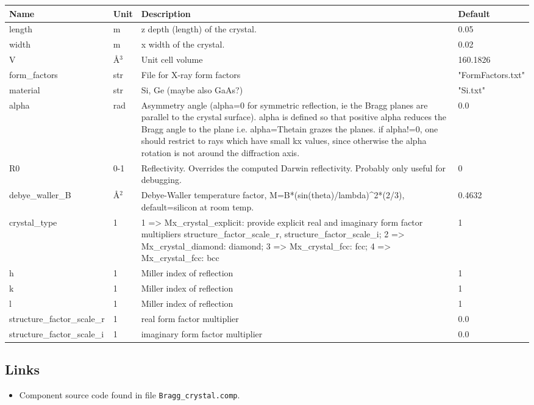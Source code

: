 \begin{longtable}{p{}p{}p{}p{}}
\toprule
\textbf{Name} & \textbf{Unit} & \textbf{Description} & \textbf{Default} \\
\midrule
\endhead
length & m & z depth (length) of the crystal. & 0.05 \\
width & m & x width of the crystal. & 0.02 \\
V & \AA{}$^{3}$ & Unit cell volume & 160.1826 \\
form\_factors & str & File for X-ray form factors & "FormFactors.txt" \\
material & str & Si, Ge (maybe also GaAs?) & "Si.txt" \\
alpha & rad & Asymmetry angle (alpha=0 for symmetric reflection, ie the Bragg planes are parallel to the crystal surface). alpha is defined so that positive alpha reduces the Bragg angle to the plane i.e. alpha=Thetain grazes the planes. if alpha!=0,  one should restrict to rays which have small kx values, since otherwise the alpha rotation is not around the diffraction axis. & 0.0 \\
R0 & 0-1 & Reflectivity. Overrides the computed Darwin reflectivity. Probably only useful for debugging. & 0 \\
debye\_waller\_B & \AA{}$^{2}$ & Debye-Waller temperature factor, M=B*(sin(theta)/lambda)\textasciicircum{}2*(2/3), default=silicon at room temp. & 0.4632 \\
crystal\_type & 1 & 1 =\textgreater{} Mx\_crystal\_explicit: provide explicit real and imaginary form factor multipliers structure\_factor\_scale\_r, structure\_factor\_scale\_i; 2 =\textgreater{} Mx\_crystal\_diamond: diamond; 3 =\textgreater{} Mx\_crystal\_fcc: fcc; 4 =\textgreater{} Mx\_crystal\_fcc: bcc & 1 \\
h & 1 & Miller index of reflection & 1 \\
k & 1 & Miller index of reflection & 1 \\
l & 1 & Miller index of reflection & 1 \\
structure\_factor\_scale\_r & 1 & real      form factor multiplier & 0.0 \\
structure\_factor\_scale\_i & 1 & imaginary form factor multiplier & 0.0 \\
\bottomrule
\end{longtable}

\subsection*{Links}
\begin{itemize}
  \item Component source code found in file \texttt{Bragg\_crystal.comp}.
\end{itemize}
